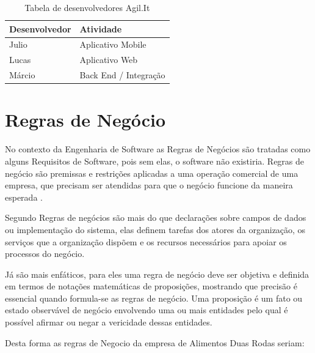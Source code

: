 \begin{table}[H]
	\centering
	\caption{\label{tabela_desenvolvedores}Tabela de desenvolvedores Agil.It}
	\begin{tabular}{|l|l|}
		\hline
		\textbf{Desenvolvedor} & \textbf{Atividade}    \\ \hline
		Julio                  & Aplicativo Mobile     \\ \hline
		Lucas                  & Aplicativo Web        \\ \hline
		Márcio                 & Back End / Integração \\ \hline
	\end{tabular}
\end{table}



\section{Regras de Negócio}
No contexto da Engenharia de Software as Regras de Negócios são tratadas como alguns Requisitos de Software, pois sem elas, o software não existiria. Regras de negócio são premissas e restrições aplicadas a uma operação comercial de uma empresa, que precisam ser atendidas para que o negócio funcione da maneira esperada \cite{crerie2008identificacao}.

Segundo \cite{2001SilviaInes} Regras de negócios são mais do que declarações sobre campos de dados ou implementação do sistema, elas definem tarefas dos atores da organização, os serviços que a organização dispõem e os recursos necessários para apoiar os processos do negócio.

Já \cite{1997kilovSimmonds} são mais enfáticos, para eles uma regra de negócio deve ser objetiva e definida em termos de notações matemáticas de proposições, mostrando que precisão é essencial quando formula-se as regras de negócio. Uma proposição é um fato ou estado observável de negócio envolvendo uma ou mais entidades pelo qual é possível afirmar ou negar a vericidade dessas entidades.

Desta forma as regras de Negocio da empresa de Alimentos Duas Rodas seriam:

